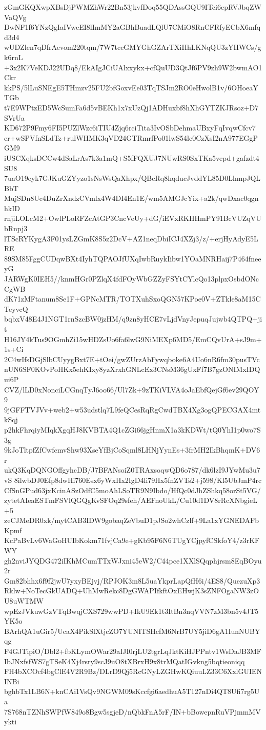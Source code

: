 zGmGKQXwpXBsDjPWMZhWr22Bn53jkvfDoq55QDAssGQU9ITci6epRVJbqZWVaQVg
DwNF1f6YNzQgIaIVwcEI8lImMY2aGBhBuadLQlU7CMiO8RnCFRfyECbX6mfqd3d4
wUDZlen7qDfrAevom220tqm/7W7tccGMYGhGZArTXiHhLKNqQU3zYHWCs/gk6rnL
+3x2K7VeKDJ22UDq8/EkAIgJCiUAlxxykx+cfQuUD3QtJf6PV9zh9W2bwmAO1Ckr
kkPS/5lLuSNEgE5THmzv25FU2bfGoxvEe03TqTSJm2RO0eHwolB1v/6OHoeaYTGb
t7E9WPtzED5WcSumFa6d5vBEKh1x7xUzQj1ADHuxbf8hXhGYTZKJRsoz+D7SVrUa
KD672P9Fmy6FI5PUZlWzc6iTIU4Zjq6rciTita3IvOSbDehmaUBxyFqIvqwCfcv7
er+wSPVfnSLdTz+rulWHMK3qVD24GTRmrfPo01lwS54lc0CzXsI2nA977EGgPGM9
iUSCXqksDCCw4dSaLrAs7k3a1mQ+S5fFQXUJ7NUwRS0SxTKa5vepd+gafzdt4SU8
7uaO19eyk7GJKuGZYyzo1sNsWsQaXhpx/QBcRq8hqducJvddYL85D0LhmpJQLBbT
MujSDn8Uc4DuZrXndzCVmlx4W4DI4En1E/wm5AMGJcYix+a2k/qwDxac0qgnhkID
rnjiLOLcM2+OwlPLoRFZcAtGP3CncVeUy+dG/iEVxRKHHmPY91BcVUZqVUbRnpj3
lTScRYKygA3F01ysLZGmK8S5z2DcV+AZ1neqDbiICJ4XZj3/z/+erjHyAdyE5LRE
89SM85FggCUDqwBXt4IyhTQPAOJfUXqIwbRuykIibw1YOaMNRHaij7P464fneeyG
JARWgK0IEH5//knmHGr0PZlqX4fdFOyWbGZZyFSYtCYlcQo13plpxOsbdONcCgWB
dK71zMFtanum8Se1F+GPNcMTR/TOTXuhSxoQGN57KPoe0V+ZTkle8aM15CTeyvcQ
bqbxV48E4J1NGT1rnSzcBW0jzHM/q9zn8yHCE7vLjdVnyJepuqJujwb4QTPQ+jit
H16JY4kTus9OGmhZi15wHDZsUo6fa6lwG9NiMEXp6MD5/EmCQvUrA+sJ9m+1s+Ci
2C4wIfsDGjSlbCUyygBxt7E+tOei/gwZUrzAbFywqboke6A4Uo6nR6fm30pusTVc
nUN6SF0KOvPoHKx5ehKIxy8yzXrxhGNLcEx3CNsM36gUxFf7B7gzONIMxIDQui6P
CVZ/lLD0xNonciLCGnqTyJ6oo66/Ul7Zk+9zTKiVLVA4oJaEbfQejGf6ev29QOY9
9jGFFTVJVv+web2+w53udstlq7L9feQCesRqRgCwdTBX4Xg3ogQPECGAX4mtkSqj
p2hkFhrqiyMIqkXgqHJ8KVBTA4Q1cZGi66jgHnmX1a3kKDWt/tQ0YhI1p0wo7S3g
9kJoTltpfZfCwfcmvShw93XseYfBjCoSqml8LHNjYynEs+3frMH2IkBhqmK+DV6r
ukQ3KqDQNGOffgyhcDB/J7BFANsoiZ0TRAxsoqwQD6o787/dk6lzI9JYwMu3u7vS
8ilwbDJ0Efp8dwHi760Esx6yWxHx2IgD4li79Hx5fnZVTs2+j598/Kl5UbJmP4rc
CfSnGPud63jxKcinASzOdfC5moAhLSoTR9N9Ibdo/HfQc0dJhZShkq58orSt5VG/
zytetAIeaESTmFSVlQGQgKvSFOq29sfeh/AEFnoUkL/Cu10d1DV8rRcXNbgieL+5
zeCJMeDR0xk/mytCAB3IDW9gobaqZeVbuD1pJSo2whCzlf+9La1xYGNEDAFbKpmf
KcPaBvLv6WaGoHUIbKokm71fvjCa9e+gKb95F6N6TUgYCjpyfCSkfoY4/z3rKFWY
gh2nviJYQDG472iIKhMCumTTxWJxni45eW2/C44pce1XXlSQqphjrsm8EqBOyu2r
Gm82bhhx6f9f2jwU7yxyBEjvj/RPJOK3m8L5uaYkprLapQfH6i/4ES8/QuezuXp3
Rklw+NoTecGkUADQ+UhMwRekc8DgGWAPIfkftOxEHwjK3sZNFOgaNW3zOU8uWTMW
wpEzJVkuwGzVTqBwqjCXS729wwPD+IkU9Ek1t3ItBn3nqVVN7zM3bn5v4JT5YK5o
BArhQA1uGir5/UcaX4PikSlXtjcZO7YUNITSHcfM6NrB7UY5jiD6gA1IunNUBYqg
F4GJTipiO/Dbl2+fbKLymOWar29aIJI0rjLU2tgrLqJktKiHJPPntv1WsDaJB3MF
IbJNxfsfWS7gTSeK4Xj4rsry9scJ9uO8tXBrxH9x8trMQatIGvkng5bqtieoniqq
FH4bXCOcf4bgClE4V2R9Bz/DLrD9Qj5RcGNyLZGHwKQiuuLZ33C6XxlGUIENINBi
bghbTx1LB6N+knCAi1VsQv9NGWM09sKccfgi6aedhuA5T127nDi4QT8Ufi7rg5Ua
7S768nTZNhSWPfW849o8Bgw5sgjeD/nQbkFnA5rF/IN+bBowepnRuVPjmmMVykti
